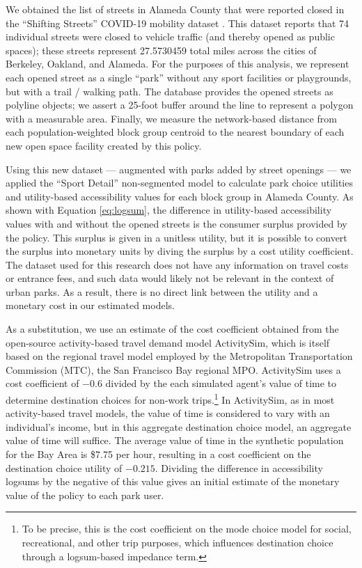 \documentclass[3p, authoryear]{elsarticle} %
\begin{document}
We obtained the list of streets in Alameda County that were reported closed
in the ``Shifting Streets'' COVID-19 mobility dataset \citep{slowstreets}. This dataset
reports that 74 individual streets were closed to vehicle
traffic (and thereby opened as public spaces); these streets represent
27.5730459 total miles across the cities
of Berkeley, Oakland, and Alameda. For the purposes of this analysis, we
represent each opened street as a single ``park'' without any sport facilities or
playgrounds, but with a trail / walking path. The database provides the opened
streets as polyline objects; we assert a 25-foot buffer around the line to
represent a polygon with a measurable area. Finally, we measure the network-based
distance from each population-weighted block group centroid to the nearest
boundary of each new open space facility created by this policy.

Using this new dataset --- augmented with parks added by street openings --- we
applied the ``Sport Detail'' non-segmented model to calculate park choice utilities
and utility-based accessibility values for each block group in Alameda County.
As shown with Equation \eqref{eq:logsum}, the difference in utility-based
accessibility values with and without the opened streets is the consumer
surplus provided by the policy. This surplus is given in a unitless utility,
but it is possible to convert the surplus into monetary units by diving the
surplus by a cost utility coefficient. The dataset used for this research does
not have any information on travel costs or entrance fees, and such data would
likely not be relevant in the context of urban parks. As a result, there is no
direct link between the utility and a monetary cost in our estimated models.

As a substitution, we use an estimate of the cost coefficient obtained from the
open-source activity-based travel demand model ActivitySim, which is itself
based on the regional travel model employed by the Metropolitan
Transportation Commission (MTC), the San Francisco Bay regional MPO.
ActivitySim uses a cost coefficient of
\(-0.6\) divided by the each simulated agent's value of time to determine
destination choices for non-work trips.\footnote{To be precise, this is the cost
  coefficient on the mode choice model for social, recreational, and other trip
  purposes, which influences destination choice through a logsum-based impedance
  term.} In ActivitySim, as in most activity-based travel models, the value of
time is considered to vary with an individual's income, but in this aggregate
destination choice model, an aggregate value of time will suffice. The average
value of time in the synthetic population for the Bay Area is \$7.75
per hour, resulting in a cost coefficient on the destination choice utility of
\(-0.215\). Dividing the difference in accessibility logsums by the negative of
this value gives an initial estimate of the monetary value of the policy
to each park user.
\end{document}
